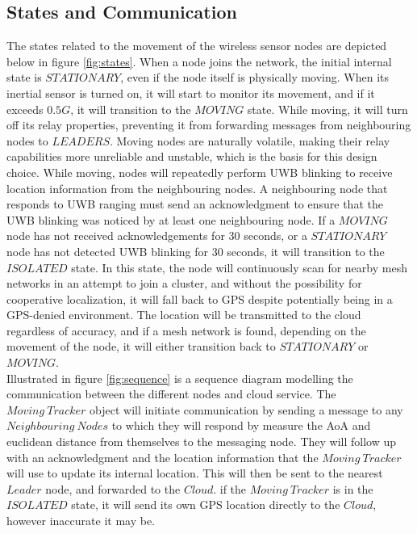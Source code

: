 \subsection{States and Communication}
\noindent The states related to the movement of the wireless sensor nodes are depicted below in figure \ref{fig:states}. When a node joins the network, the initial internal state is $STATIONARY$, even if the node itself is physically moving. When its inertial sensor is turned on, it will start to monitor its movement, and if it exceeds $0.5G$, it will transition to the $MOVING$ state. While moving, it will turn off its relay properties, preventing it from forwarding messages from neighbouring nodes to $LEADERS$. Moving nodes are naturally volatile, making their relay capabilities more unreliable and unstable, which is the basis for this design choice. While moving, nodes will repeatedly perform UWB blinking to receive location information from the neighbouring nodes. A neighbouring node that responds to UWB ranging must send an acknowledgment to ensure that the UWB blinking was noticed by at least one neighbouring node. If a $MOVING$ node has not received acknowledgements for 30 seconds, or a $STATIONARY$ node has not detected UWB blinking for 30 seconds, it will transition to the $ISOLATED$ state. In this state, the node will continuously scan for nearby mesh networks in an attempt to join a cluster, and without the possibility for cooperative localization, it will fall back to GPS despite potentially being in a GPS-denied environment. The location will be transmitted to the cloud regardless of accuracy, and if a mesh network is found, depending on the movement of the node, it will either transition back to $STATIONARY$ or $MOVING$.\\

\noindent Illustrated in figure \ref{fig:sequence} is a sequence diagram modelling the communication between the different nodes and cloud service. The $Moving\  Tracker$ object will initiate communication by sending a message to any $Neighbouring\ Nodes$ to which they will respond by measure the AoA and euclidean distance from themselves to the messaging node. They will follow up with an acknowledgment and the location information that the $Moving\ Tracker$ will use to update its internal location. This will then be sent to the nearest $Leader$ node, and forwarded to the $Cloud$. if the $Moving\ Tracker$ is in the $ISOLATED$ state, it will send its own GPS location directly to the $Cloud$, however inaccurate it may be. 

